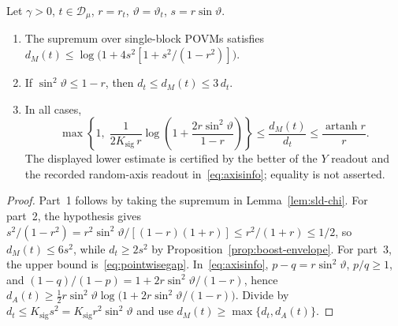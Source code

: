 \begin{proposition}
\label{prop:readout-gap}
Let $\gamma>0$, $t\in\mathcal D_\mu$, $r=r_t$, $\vartheta=\vartheta_t$,
$s=r\sin\vartheta$.
\begin{enumerate}
\item The supremum over single-block POVMs satisfies
$d_M(t)\le\log\bigl(1+4s^2[1+s^2/(1-r^2)]\bigr)$.
\item If $\sin^2\vartheta\le 1-r$, then $d_t\le d_M(t)\le 3\,d_t$.
\item In all cases,
\begin{equation}
\max\left\{1,\;\frac{1}{2K_{\mathrm{sig}}\,r}
\log\!\left(1+\frac{2r\sin^2\vartheta}{1-r}\right)\right\}
\le\frac{d_M(t)}{d_t}\le\frac{\operatorname{artanh} r}{r}.
\label{eq:gap-two-sided}
\end{equation}
The displayed lower estimate is certified by the better of the $Y$ readout
and the recorded random-axis readout in~\eqref{eq:axisinfo}; equality is not asserted.
\end{enumerate}
\end{proposition}

\begin{proof}
Part~1 follows by taking the supremum in Lemma~\ref{lem:sld-chi}. For part~2, the hypothesis gives
$s^2/(1-r^2)=r^2\sin^2\vartheta/[(1-r)(1+r)]\le r^2/(1+r)\le 1/2$, so
$d_M(t)\le 6s^2$, while $d_t\ge 2s^2$ by Proposition~\ref{prop:boost-envelope}.
For part~3, the upper bound is~\eqref{eq:pointwisegap}. In~\eqref{eq:axisinfo},
$p-q=r\sin^2\vartheta$, $p/q\ge 1$, and
$(1-q)/(1-p)=1+2r\sin^2\vartheta/(1-r)$, hence
$d_A(t)\ge \tfrac12 r\sin^2\vartheta
\log\bigl(1+2r\sin^2\vartheta/(1-r)\bigr)$.
Divide by $d_t\le K_{\mathrm{sig}}s^2=K_{\mathrm{sig}}r^2\sin^2\vartheta$
and use $d_M(t)\ge\max\{d_t,d_A(t)\}$.
\end{proof}

